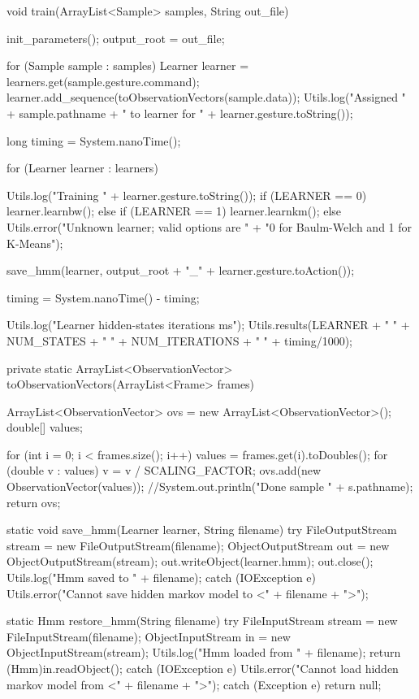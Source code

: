 \documentclass[12pt,a4,notitlepage]{report}
\renewcommand{\_}{\texttt{\symbol{95}}}
\newcommand{\<}{\texttt{\symbol{60}}}
\renewcommand{\>}{\texttt{\symbol{62}}}
\begin{document}
\begin{code}
{	void train(ArrayList<Sample> samples, String out_file)
	{
		init_parameters();
		output_root = out_file;

		for (Sample sample : samples)
		{
			Learner learner = learners.get(sample.gesture.command);
			learner.add_sequence(toObservationVectors(sample.data));
			Utils.log("Assigned " + sample.pathname +
			 " to learner for " + learner.gesture.toString());
		}
		
		long timing = System.nanoTime();
		
		for (Learner learner : learners)
		{
			Utils.log("Training " + learner.gesture.toString());
			if (LEARNER == 0)
			{	
				learner.learnbw();
			}
			else if (LEARNER == 1)
			{
				learner.learnkm();
			}
			else
			{
				Utils.error("Unknown learner; valid options are " +
					"0 for Baulm-Welch and 1 for K-Means");
			}
			
			save_hmm(learner, output_root + "_" + learner.gesture.toAction());
		}
		
        timing = System.nanoTime() - timing;
        
        Utils.log("Learner hidden-states iterations ms");
        Utils.results(LEARNER + " " + NUM_STATES + " " + NUM_ITERATIONS + " " + timing/1000);
	}

	private static ArrayList<ObservationVector> toObservationVectors(ArrayList<Frame> frames)
	{
		ArrayList<ObservationVector> ovs = new ArrayList<ObservationVector>();
		double[] values;
		
		for (int i = 0; i < frames.size(); i++)
		{
			values = frames.get(i).toDoubles();
			for (double v : values)
			{
				v  = v / SCALING_FACTOR;
			}
			ovs.add(new ObservationVector(values));
		}
		//System.out.println("Done sample " + s.pathname);
		return ovs;
	}
		
	static void save_hmm(Learner learner, String filename)
	{
		try
		{
			FileOutputStream stream = new FileOutputStream(filename);
			ObjectOutputStream out = new ObjectOutputStream(stream);
			out.writeObject(learner.hmm);
			out.close();
		    Utils.log("Hmm saved to " + filename);
		}
		catch (IOException e)
		{
			Utils.error("Cannot save hidden markov model to <" + filename + ">");
		}
	}
	
	static Hmm restore_hmm(String filename)
	{
		try
		{
			FileInputStream stream = new FileInputStream(filename);
			ObjectInputStream in = new ObjectInputStream(stream);
		    Utils.log("Hmm loaded from " + filename);
			return (Hmm)in.readObject();
		}
		catch (IOException e)
		{
			Utils.error("Cannot load hidden markov model from <" + filename + ">");
		}
		catch (Exception e)
		{}
		return null;
	}

}
\end{code}
\end{document}
